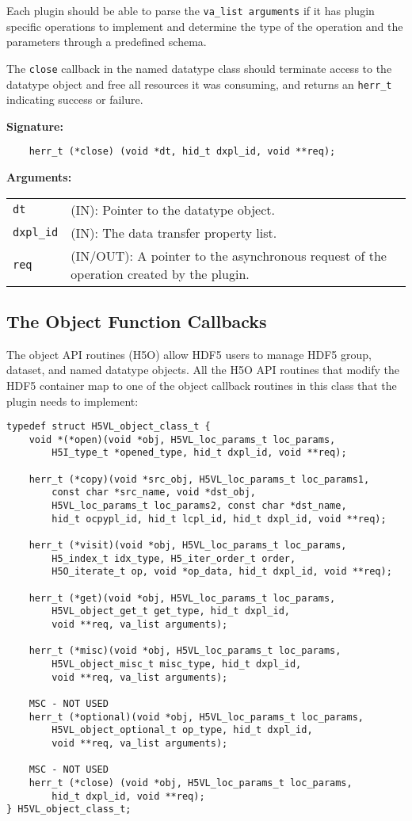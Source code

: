 Each plugin should be able to parse the {\tt va\_list arguments} if it has plugin specific operations to implement and determine the type of the operation and the parameters through a predefined schema. 

The {\tt close} callback in the named datatype class should terminate
access to the datatype object and free all resources it was
consuming, and returns an {\tt herr\_t} indicating success or failure.

\textbf{Signature:}
\begin{lstlisting}
    herr_t (*close) (void *dt, hid_t dxpl_id, void **req);
\end{lstlisting}

\textbf{Arguments:}\\
\begin{tabular}{l p{10cm}}
  {\tt dt} & (IN): Pointer to the datatype object.\\
  {\tt dxpl\_id} & (IN): The data transfer property list.\\
  {\tt req} & (IN/OUT): A pointer to the asynchronous request of the
  operation created by the plugin.\\
\end{tabular}

\subsection{The Object Function Callbacks}
The object API routines (H5O) allow HDF5 users to manage HDF5 group,
dataset, and named datatype objects. All the H5O API routines that
modify the HDF5 container map to one of the object callback routines
in this class that the plugin needs to implement:

\begin{lstlisting}
typedef struct H5VL_object_class_t {
    void *(*open)(void *obj, H5VL_loc_params_t loc_params, 
        H5I_type_t *opened_type, hid_t dxpl_id, void **req);

    herr_t (*copy)(void *src_obj, H5VL_loc_params_t loc_params1, 
        const char *src_name, void *dst_obj, 
        H5VL_loc_params_t loc_params2, const char *dst_name,
        hid_t ocpypl_id, hid_t lcpl_id, hid_t dxpl_id, void **req);

    herr_t (*visit)(void *obj, H5VL_loc_params_t loc_params, 
        H5_index_t idx_type, H5_iter_order_t order, 
        H5O_iterate_t op, void *op_data, hid_t dxpl_id, void **req);

    herr_t (*get)(void *obj, H5VL_loc_params_t loc_params, 
        H5VL_object_get_t get_type, hid_t dxpl_id, 
        void **req, va_list arguments);

    herr_t (*misc)(void *obj, H5VL_loc_params_t loc_params, 
        H5VL_object_misc_t misc_type, hid_t dxpl_id, 
        void **req, va_list arguments);

    MSC - NOT USED
    herr_t (*optional)(void *obj, H5VL_loc_params_t loc_params, 
        H5VL_object_optional_t op_type, hid_t dxpl_id, 
        void **req, va_list arguments);

    MSC - NOT USED
    herr_t (*close) (void *obj, H5VL_loc_params_t loc_params, 
        hid_t dxpl_id, void **req);
} H5VL_object_class_t;
\end{lstlisting}

